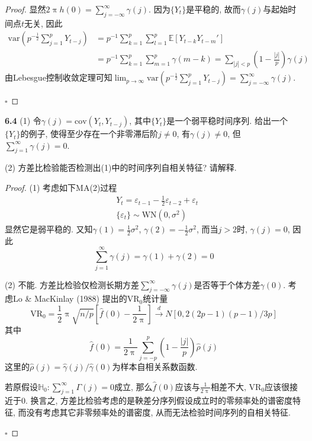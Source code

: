 \documentclass[cn,12pt,math=mtpro2,citestyle=gb7714-2015,bibstyle=gb7714-2015,twocol,mode=simple]{elegantbook}
\newcommand{\HH}{\mathbb{H}}
\newcommand{\E}{\mathbb{E}}
\begin{document}
\begin{proof}
  显然$2\uppi h(0)=\displaystyle\sum_{j=-\infty}^{\infty}\gamma(j)$. 因为$\{Y_t\}$是平稳的, 故而$\gamma(j)$与起始时间点$t$无关, 因此
  \begin{align*}
  \text{var}\left(p^{-\frac{1}{2}}\sum_{j=1}^{p}Y_{t-j}\right)&=p^{-1}\sum_{k=1}^{p}\sum_{l=1}^{p}\E[Y_{t-k}Y_{t-m}'] \\
  &=p^{-1}\sum_{k=1}^{p}\sum_{m=1}^{p}\gamma(m-k)=\sum_{|j|<p}\left(1-\frac{|j|}{p}\right)\gamma(j)
  \end{align*}
  由Lebesgue控制收敛定理可知$\displaystyle\lim_{p\to\infty}\text{var}\left(p^{-\frac{1}{2}}\sum_{j=1}^{p}Y_{t-j}\right)=\sum_{j=-\infty}^{\infty}\gamma(j)$.

  $\square$
\end{proof}

\textbf{6.4} (1) 令$\gamma(j)=\text{cov}(Y_t,Y_{t-j})$, 其中$\{Y_t\}$是一个弱平稳时间序列. 给出一个$\{Y_t\}$的例子, 使得至少存在一个非零滞后阶$j\neq0$, 有$\gamma(j)\neq0$, 但$\displaystyle\sum_{j=1}^{\infty}\gamma(j)=0$.

(2) 方差比检验能否检测出(1)中的时间序列自相关特征? 请解释.

\begin{proof}
(1) 考虑如下MA(2)过程
\begin{align*}
& Y_t=\varepsilon_{t-1}-\frac{1}{2}\varepsilon_{t-2}+\varepsilon_t \\
&\{\varepsilon_t\}\sim \text{WN}(0,\sigma^2)
\end{align*}
显然它是弱平稳的. 又知$\gamma(1)=\displaystyle\frac{1}{2}\sigma^2$, $\gamma(2)=\displaystyle-\frac{1}{2}\sigma^2$, 而当$j>2$时, $\gamma(j)=0$, 因此
$$\sum_{j=1}^{\infty}\gamma(j)=\gamma(1)+\gamma(2)=0$$

(2) 不能. 方差比检验仅检测长期方差$\displaystyle\sum_{j=-\infty}^{\infty}\gamma(j)$是否等于个体方差$\gamma(0)$. 考虑Lo \& MacKinlay (1988) 提出的$\text{VR}_0$统计量
$$\text{VR}_0=\frac{1}{2}\uppi\sqrt{n/p}\left[\hat{f}(0)-\frac{1}{2\uppi}\right]\xrightarrow{d}N[0,2(2p-1)(p-1)/3p]$$
其中
$$\hat{f}(0)=\frac{1}{2\uppi}\sum_{j=-p}^{p}\left(1-\frac{|j|}{p}\right)\hat{\rho}(j)$$
这里的$\hat{\rho}(j)=\hat{\gamma}(j)/\hat{\gamma}(0)$为样本自相关系数函数.

若原假设$\HH_0: \displaystyle\sum_{j=1}^{\infty}\Gamma(j)=0$成立, 那么$\hat{f}(0)$应该与$\displaystyle\frac{1}{2\uppi}$相差不大, $\text{VR}_0$应该很接近于0. 换言之, 方差比检验考虑的是鞅差分序列假设成立时的零频率处的谱密度特征, 而没有考虑其它非零频率处的谱密度, 从而无法检验时间序列的自相关特征.

$\square$
\end{proof}
\end{document}
